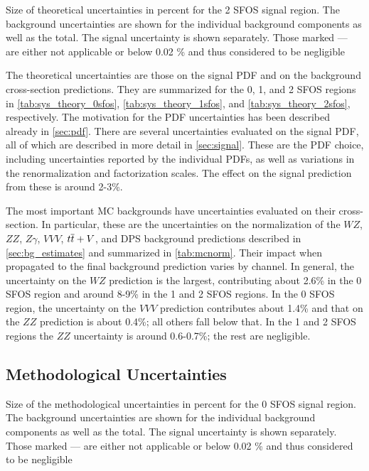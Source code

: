 \begin{table}[ht]
\centering

\caption{Size of theoretical uncertainties in percent for the 2 SFOS signal region. The background uncertainties are shown for the individual background components as well as the total. The signal uncertainty is shown separately. Those marked --- are either not applicable or below 0.02 \% and thus considered to be negligible}
\label{tab:sys_theory_2sfos}
\end{table}

The theoretical uncertainties are those on the signal PDF and 
on the background cross-section predictions.
They are summarized for the 0, 1, and 2 SFOS regions
in \tab\ref{tab:sys_theory_0sfos}, 
\tab\ref{tab:sys_theory_1sfos}, and
\tab\ref{tab:sys_theory_2sfos}, respectively.
The motivation for the PDF uncertainties has been described
already in \sec\ref{sec:pdf}. 
There are several uncertainties evaluated on the signal PDF, all of which
are described in more detail in \sec\ref{sec:signal}. These
are the PDF choice, including uncertainties reported by the individual
PDFs, as well as variations in the renormalization and factorization scales.
The effect on the signal prediction from these is around 2-3\%.

The most important MC backgrounds have uncertainties evaluated on their
cross-section.  In particular, these are the uncertainties on the 
normalization of the $WZ$, $ZZ$, $Z\gamma$, $VVV$, $t\overline{t}+V$, 
and DPS background predictions
described in \sec\ref{sec:bg_estimates} and summarized in \tab\ref{tab:mcnorm}.
Their impact when propagated to the final background prediction
varies by channel. In general, the uncertainty on the $WZ$ prediction is the 
largest, contributing about 2.6\% in the 0 SFOS region and around 8-9\%
in the 1 and 2 SFOS regions.  In the 0 SFOS region, the uncertainty 
on the $VVV$ prediction contributes about 1.4\% and that on the $ZZ$ prediction
is about 0.4\%; all others fall below that. 
In the 1 and 2 SFOS regions the $ZZ$ uncertainty is around 0.6-0.7\%; the
rest are negligible. 

\subsection{Methodological Uncertainties}

\begin{table}[ht!]
\centering

\caption{Size of the methodological uncertainties in percent for the 0 SFOS signal region. The background uncertainties are shown for the individual background components as well as the total. The signal uncertainty is shown separately. Those marked --- are either not applicable or below 0.02 \% and thus considered to be negligible}
\label{tab:sys_meth_0sfos}
\end{table}

